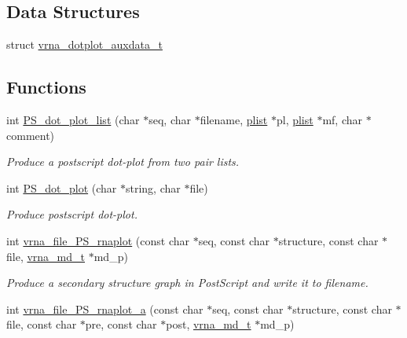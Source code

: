 \subsection*{Data Structures}
\begin{DoxyCompactItemize}
\item 
struct \mbox{\hyperlink{group__plotting__utils_structvrna__dotplot__auxdata__t}{vrna\+\_\+dotplot\+\_\+auxdata\+\_\+t}}
\end{DoxyCompactItemize}
\subsection*{Functions}
\begin{DoxyCompactItemize}
\item 
int \mbox{\hyperlink{group__plotting__utils_ga00ea223b5cf02eb2faae5ff29f0d5e12}{P\+S\+\_\+dot\+\_\+plot\+\_\+list}} (char $\ast$seq, char $\ast$filename, \mbox{\hyperlink{group__data__structures_ga9608eed021ebfbdd7a901cfdc446c8e9}{plist}} $\ast$pl, \mbox{\hyperlink{group__data__structures_ga9608eed021ebfbdd7a901cfdc446c8e9}{plist}} $\ast$mf, char $\ast$comment)
\begin{DoxyCompactList}\small\item\em Produce a postscript dot-\/plot from two pair lists. \end{DoxyCompactList}\item 
int \mbox{\hyperlink{group__plotting__utils_ga689a97a7e3b8a2df14728b8204d9d57b}{P\+S\+\_\+dot\+\_\+plot}} (char $\ast$string, char $\ast$file)
\begin{DoxyCompactList}\small\item\em Produce postscript dot-\/plot. \end{DoxyCompactList}\item 
int \mbox{\hyperlink{group__plotting__utils_gabdc8f6548ba4a3bc3cd868ccbcfdb86a}{vrna\+\_\+file\+\_\+\+P\+S\+\_\+rnaplot}} (const char $\ast$seq, const char $\ast$structure, const char $\ast$file, \mbox{\hyperlink{group__model__details_ga1f8a10e12a0a1915f2a4eff0b28ea17c}{vrna\+\_\+md\+\_\+t}} $\ast$md\+\_\+p)
\begin{DoxyCompactList}\small\item\em Produce a secondary structure graph in Post\+Script and write it to \textquotesingle{}filename\textquotesingle{}. \end{DoxyCompactList}\item 
int \mbox{\hyperlink{group__plotting__utils_ga139a31dd0ba9fc6612431f67de901c31}{vrna\+\_\+file\+\_\+\+P\+S\+\_\+rnaplot\+\_\+a}} (const char $\ast$seq, const char $\ast$structure, const char $\ast$file, const char $\ast$pre, const char $\ast$post, \mbox{\hyperlink{group__model__details_ga1f8a10e12a0a1915f2a4eff0b28ea17c}{vrna\+\_\+md\+\_\+t}} $\ast$md\+\_\+p)

\end{DoxyCompactItemize}
